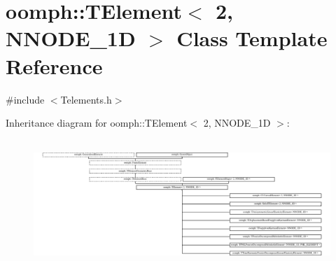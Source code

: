 \hypertarget{classoomph_1_1TElement_3_012_00_01NNODE__1D_01_4}{}\section{oomph\+:\+:T\+Element$<$ 2, N\+N\+O\+D\+E\+\_\+1D $>$ Class Template Reference}
\label{classoomph_1_1TElement_3_012_00_01NNODE__1D_01_4}


{\ttfamily \#include $<$Telements.\+h$>$}

Inheritance diagram for oomph\+:\+:T\+Element$<$ 2, N\+N\+O\+D\+E\+\_\+1D $>$\+:\begin{figure}[H]
\begin{center}
\leavevmode
\includegraphics[height=4.843646cm]{classoomph_1_1TElement_3_012_00_01NNODE__1D_01_4}
\end{center}
\end{figure}
